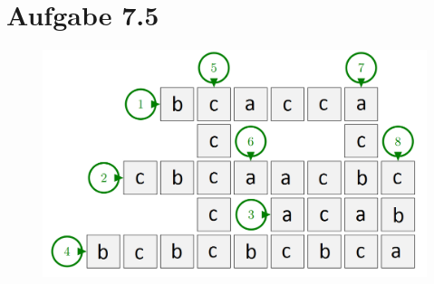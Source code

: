 \documentclass{article}
\begin{document}
\section*{Aufgabe 7.5}
\begin{figure}[!h]
  \includegraphics[scale=0.4]{crossword.png}
\end{figure}
\end{document}
